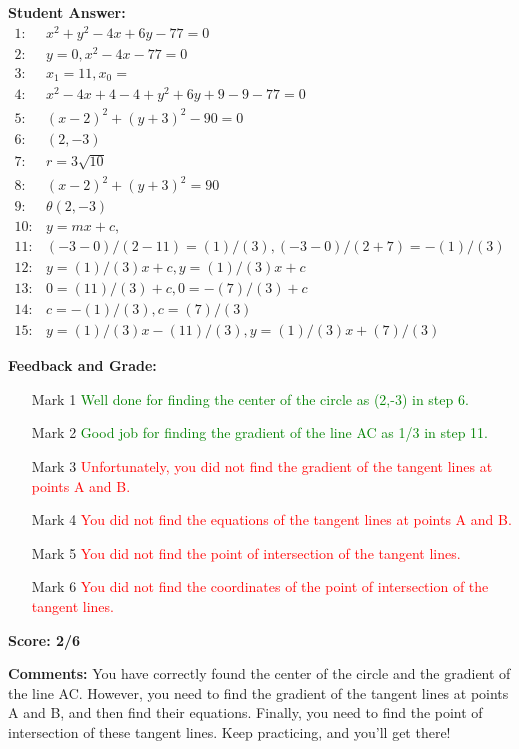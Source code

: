 \documentclass{article}
\begin{document}
\textbf{Student Answer:}
\begin{align*}
1: & x^2+y^2-4x+6y-77=0 \\
2: & y=0,x^2-4x-77=0 \\
3: & x_1=11, x_0= \\
4: & x^2-4x+4-4+y^2+6y+9-9-77=0 \\
5: & (x-2)^2+(y+3)^2-90=0 \\
6: & (2,-3) \\
7: & r=3\sqrt{10} \\
8: & (x-2)^2+(y+3)^2=90 \\
9: & \theta(2,-3) \\
10: & y=mx+c, \\
11: & (-3-0)/(2-11)=(1)/(3),(-3-0)/(2+7)=-(1)/(3) \\
12: & y=(1)/(3)x+c,y=(1)/(3)x+c \\
13: & 0=(11)/(3)+c,0=-(7)/(3)+c \\
14: & c=-(1)/(3),c=(7)/(3) \\
15: & y=(1)/(3)x-(11)/(3),y=(1)/(3)x+(7)/(3)
\end{align*}

\textbf{Feedback and Grade:}
\begin{itemize}
\item[Mark 1] \textcolor{green}{Well done for finding the center of the circle as (2,-3) in step 6.}
\item[Mark 2] \textcolor{green}{Good job for finding the gradient of the line AC as 1/3 in step 11.}
\item[Mark 3] \textcolor{red}{Unfortunately, you did not find the gradient of the tangent lines at points A and B.}
\item[Mark 4] \textcolor{red}{You did not find the equations of the tangent lines at points A and B.}
\item[Mark 5] \textcolor{red}{You did not find the point of intersection of the tangent lines.}
\item[Mark 6] \textcolor{red}{You did not find the coordinates of the point of intersection of the tangent lines.}
\end{itemize}

\textbf{Score: 2/6}

\textbf{Comments:} You have correctly found the center of the circle and the gradient of the line AC. However, you need to find the gradient of the tangent lines at points A and B, and then find their equations. Finally, you need to find the point of intersection of these tangent lines. Keep practicing, and you'll get there!
\end{document}
